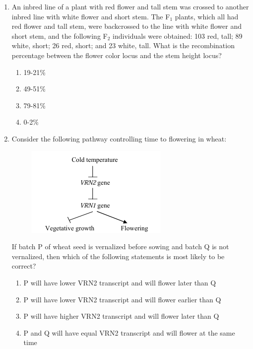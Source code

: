 \documentclass[journal,12pt,onecolumn]{IEEEtran}
\begin{document}
\begin{enumerate}[label=\arabic*.,resume]

\item An inbred line of a plant with red flower and tall stem was crossed to another inbred line with white flower and short stem. The F$_1$ plants, which all had red flower and tall stem, were backcrossed to the line with white flower and short stem, and the following F$_2$ individuals were obtained: 103 red, tall; 89 white, short; 26 red, short; and 23 white, tall. What is the recombination percentage between the flower color locus and the stem height locus?

\begin{multicols}{2}
\begin{enumerate}[label=(\Alph*)]
\item 19-21\%
\item 49-51\%
\item 79-81\%
\item 0-2\%
\end{enumerate}
\end{multicols}

\item Consider the following pathway controlling time to flowering in wheat:
\begin{figure}[H]
\centering
\includegraphics[width=0.7\columnwidth]{FIG/J-12.png}
\caption*{}
\label{fig:J-12}
\end{figure}

If batch P of wheat seed is vernalized before sowing and batch Q is not vernalized, then which of the following statements is most likely to be correct?

\begin{enumerate}[label=(\Alph*)]
\item P will have lower VRN2 transcript and will flower later than Q
\item P will have lower VRN2 transcript and will flower earlier than Q
\item P will have higher VRN2 transcript and will flower later than Q
\item P and Q will have equal VRN2 transcript and will flower at the same time
\end{enumerate}


\end{enumerate}
\end{document}
